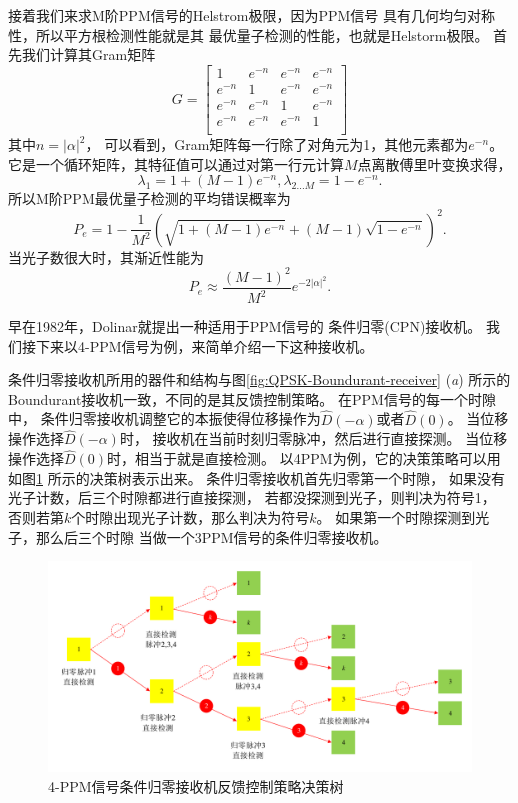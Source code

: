 接着我们来求M阶PPM信号的Helstrom极限，因为PPM信号
具有几何均匀对称性，所以平方根检测性能就是其
最优量子检测的性能，也就是Helstorm极限。
首先我们计算其Gram矩阵
\begin{equation}
G = \left[
\begin{array}{cccc}
 1 & e^{-n} & e^{-n} & e^{-n} \\
 e^{-n} & 1 & e^{-n} & e^{-n} \\
 e^{-n} & e^{-n} & 1 & e^{-n} \\
 e^{-n} & e^{-n} & e^{-n} & 1 \\
\end{array}
\right]
\end{equation}
其中$n=|\alpha|^2$，
可以看到，Gram矩阵每一行除了对角元为1，其他元素都为$e^{-n}$。
它是一个循环矩阵，其特征值可以通过对第一行元计算$M$点离散傅里叶变换求得\cite{zxd2004matrix}，
\begin{equation}
\lambda_1 = 1 + (M-1)e^{-n}, \lambda_{2...M} = 1-e^{-n}.
\end{equation}
所以M阶PPM最优量子检测的平均错误概率为
\begin{equation}
P_e = 1 - \frac{1}{M^2}(\sqrt{1 + (M-1)e^{-n}} + (M-1)\sqrt{1-e^{-n}})^2.
\end{equation}
当光子数很大时，其渐近性能为
\begin{equation}
P_e \approx \frac{(M-1)^2}{M^2} e^{-2|\alpha|^2}.
\end{equation}

早在1982年，Dolinar就提出一种适用于PPM信号的
条件归零(CPN)接收机\cite{dolinar1982near}。
我们接下来以4-PPM信号为例，来简单介绍一下这种接收机。

条件归零接收机所用的器件和结构与图\ref{fig:QPSK-Boundurant-receiver} (\textit{a})
所示的Boundurant接收机一致，不同的是其反馈控制策略。
在PPM信号的每一个时隙中，
条件归零接收机调整它的本振使得位移操作为$\hat{D}(-\alpha)$或者$\hat{D}(0)$。
当位移操作选择$\hat{D}(-\alpha)$时，
接收机在当前时刻归零脉冲，然后进行直接探测。
当位移操作选择$\hat{D}(0)$时，相当于就是直接检测。
以4PPM为例，它的决策策略可以用如图\ref{fig:CPN-Decision-Tree}
所示的决策树表示出来。
条件归零接收机首先归零第一个时隙，
如果没有光子计数，后三个时隙都进行直接探测，
若都没探测到光子，则判决为符号1，
否则若第$k$个时隙出现光子计数，那么判决为符号$k$。
如果第一个时隙探测到光子，那么后三个时隙
当做一个3PPM信号的条件归零接收机。

\begin{figure}
\centering
  \includegraphics[width=\textwidth]{figures/chap2/CPN-Decision-Tree}
  \caption{4-PPM信号条件归零接收机反馈控制策略决策树}
  \label{fig:CPN-Decision-Tree}
\end{figure}

